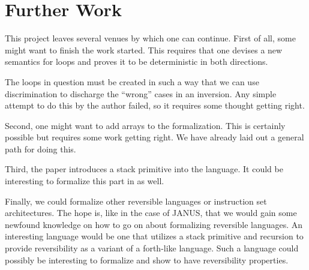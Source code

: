 \chapter{Further Work}

This project leaves several venues by which one can continue. First of
all, some might want to finish the work started. This requires that
one devises a new semantics for loops and proves it to be
deterministic in both directions.

The loops in question must be created in such a way that we can use
discrimination to discharge the ``wrong'' cases in an inversion. Any
simple attempt to do this by the author failed, so it requires some
thought getting right.

Second, one might want to add arrays to the formalization. This is
certainly possible but requires some work getting right. We have
already laid out a general path for doing this.

Third, the paper \cite{glueck+2008} introduces a stack primitive into
the language. It could be interesting to formalize this part in \coq{}
as well.

Finally, we could formalize other reversible languages or instruction
set architectures. The hope is, like in the case of JANUS, that we
would gain some newfound knowledge on how to go on about formalizing
reversible languages. An interesting language would be one that
utilizes a stack primitive and recursion to provide reversibility as a
variant of a forth-like language. Such a language could possibly be
interesting to formalize and show to have reversibility properties.

